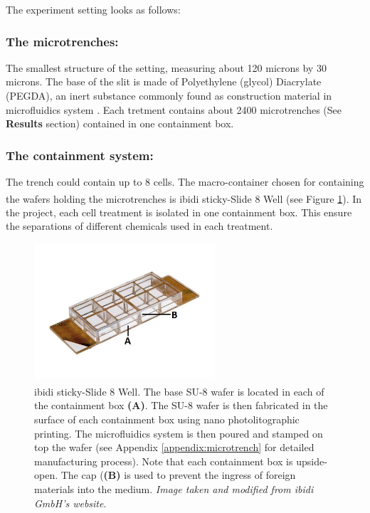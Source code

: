 \documentclass[pdftex,12pt,a4paper]{report}
\begin{document}
The experiment setting looks as follows:

\subsubsection*{The microtrenches:}

The smallest structure of the setting, measuring about 120 microns by 30 microns. The base of the slit is made of Polyethylene (glycol) Diacrylate (PEGDA), an inert substance commonly found as construction material in microfluidics system \cite{sekhavati2015marker}. Each tretment contains about 2400 microtrenches (See \textbf{Results} section) contained in one containment box.

\subsubsection*{The containment system:}

The trench could contain up to 8 cells. The macro-container chosen for containing the wafers holding the microtrenches is ibidi\textsuperscript{\textregistered} sticky-Slide 8 Well (see Figure \ref{fig:ibidi}). In the project, each cell treatment is isolated in one containment box. This ensure the separations of different chemicals used in each treatment. 

\begin{figure}[h]
\centering
\includegraphics[width=0.6\textwidth]{images/sticky-slide-8-well-marked}
\caption{ibidi\textsuperscript{\textregistered} sticky-Slide 8 Well. The base SU-8 wafer is located in each of the containment box \textbf{(A)}. The SU-8 wafer is then fabricated in the surface of each containment box using nano photolitographic printing. The microfluidics system is then poured and stamped on top the wafer (see Appendix \ref{appendix:microtrench} for detailed manufacturing process). Note that each containment box is upside-open. The cap (\textbf{(B)} is used to prevent the ingress of foreign materials into the medium. \textit{Image taken and modified from ibidi GmbH's website}.}
\label{fig:ibidi}
\end{figure}
\end{document}
